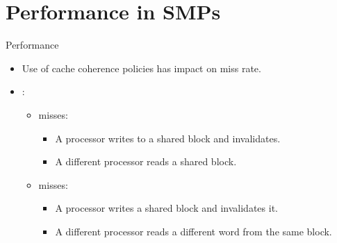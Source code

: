 \section{Performance in SMPs}

\begin{frame}[t]{Performance}
\begin{itemize}
  \item Use of cache coherence policies has impact on miss rate.

  \item {}:
    \begin{itemize}
      \item {} misses:
        \begin{itemize}
          \item A processor writes to a shared block and invalidates.
          \item A different processor reads a shared block.
        \end{itemize}
      \item {} misses:
        \begin{itemize}
          \item A processor writes a shared block and invalidates it.
          \item A different processor reads a different word from the same block.
        \end{itemize}
    \end{itemize}
\end{itemize}
\end{frame}

